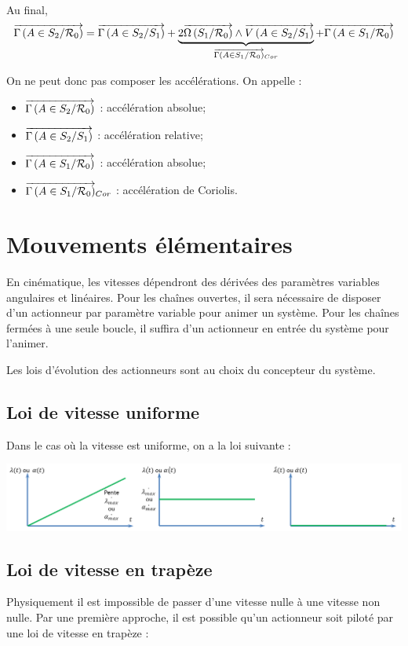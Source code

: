 \documentclass[10pt,oneside]{article}
\begin{document}
Au final, 
$$
\overrightarrow{\Gamma \left( {A} \in {S_2}/{\mathcal{R}_0}\right)}
=
\overrightarrow{\Gamma \left( {A} \in {S_2}/{S_1}\right)} + \underbrace{2\overrightarrow{\Omega\left( {S_1}/{\mathcal{R}_0}\right)}\wedge\overrightarrow{V\left( {A} \in {S_2}/{S_1}\right)}}_{\overrightarrow{\Gamma \left( {A} \in {S_1}/{\mathcal{R}_0}\right)}_{Cor}}
+\overrightarrow{\Gamma \left( {A} \in {S_1}/{\mathcal{R}_0}\right)} 
$$


\begin{resultat}
On ne peut donc pas composer les accélérations.
On appelle : 
\begin{itemize}
\item $\overrightarrow{\Gamma \left( {A} \in {S_2}/{\mathcal{R}_0}\right)}$ : accélération absolue;
\item $\overrightarrow{\Gamma \left( {A} \in {S_2}/{S_1}\right)}$ : accélération relative;
\item $\overrightarrow{\Gamma \left( {A} \in {S_1}/{\mathcal{R}_0}\right)}$ : accélération absolue;
\item $\overrightarrow{\Gamma \left( {A} \in {S_1}/{\mathcal{R}_0}\right)}_{Cor}$ : accélération de Coriolis.
\end{itemize}
\end{resultat}

\section{Mouvements élémentaires}

En cinématique, les vitesses dépendront des dérivées des paramètres variables angulaires et linéaires. Pour les chaînes ouvertes, il sera nécessaire de disposer d'un actionneur par paramètre variable pour animer un système. Pour les chaînes fermées à une seule boucle, il suffira d'un actionneur en entrée du système pour l'animer.

Les lois d'évolution des actionneurs sont au choix du concepteur du système. 

\subsection{Loi de vitesse uniforme}
Dans le cas où la vitesse est uniforme, on a la loi suivante : 

\begin{center}
\includegraphics[width=.95\textwidth]{png/loi1}
\end{center}

\subsection{Loi de vitesse en trapèze}
Physiquement il est impossible de passer d'une vitesse nulle à une vitesse non nulle. Par une première approche, il est possible qu'un actionneur soit piloté par une loi de vitesse en trapèze :
\end{document}
